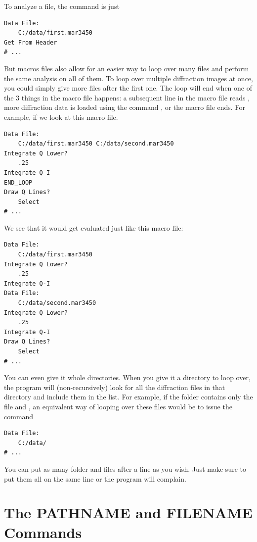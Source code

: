 To analyze a file, the command is just 
\begin{lstlisting}[caption={'Load the Diffraction Data'}]
Data File:
    C:/data/first.mar3450
Get From Header
# ...
\end{lstlisting}
But macros files also allow for an easier way
to loop over many files and perform the same
analysis on all of them.  
To loop over multiple diffraction images at once,
you could simply give more files after the first 
one. The loop will end when 
one of the 3 things in the macro 
file happens: a subsequent line in the macro
file reads , more diffraction data
is loaded using the command , or
the macro file ends. For example, if we look at this 
macro file.
\begin{lstlisting}[caption={'Loop Over Diffraction Data'}]
Data File:
    C:/data/first.mar3450 C:/data/second.mar3450 
Integrate Q Lower?
    .25
Integrate Q-I
END_LOOP
Draw Q Lines?
    Select
# ...
\end{lstlisting}
We see that it would get evaluated just like this
macro file:
\begin{lstlisting}[caption={'An Equivalent Macro'}]
Data File:
    C:/data/first.mar3450 
Integrate Q Lower?
    .25
Integrate Q-I
Data File:
    C:/data/second.mar3450 
Integrate Q Lower?
    .25
Integrate Q-I
Draw Q Lines?
    Select
# ...
\end{lstlisting}
You can even give it whole directories. When
you give it a directory to loop over, the program 
will (non-recursively) look for all the diffraction 
files in that directory and include them in the list. 
For example, if the folder  contains
only the file  and
, an equivalent way of looping
over these files would be to issue the command
\begin{lstlisting}[caption={'Load the Diffraction Data'}]
Data File:
    C:/data/
# ...
\end{lstlisting}
You can put as many folder and files after a 
 line as you wish.
Just make sure to put them all on the same line 
or the program will complain.

\section{The PATHNAME and FILENAME Commands}

